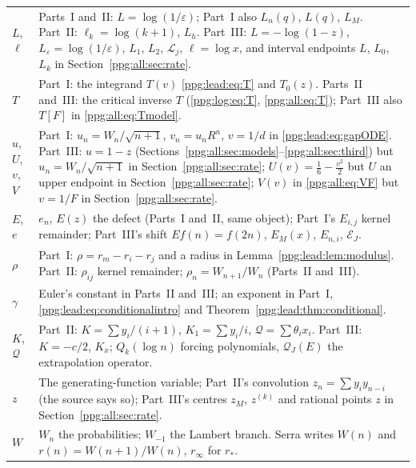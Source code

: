 \documentclass[11pt,letterpaper]{article}
\theoremstyle{remark}\newtheorem{remark}[theorem]{Remark}
\numberwithin{equation}{section}
\begin{document}
\begin{longtable}{@{}>{\raggedright\arraybackslash}p{} >{\raggedright\arraybackslash}p{}@{}}
$L$, $\ell$ & Parts~I and~II: $L=\log(1/\varepsilon)$; Part~I also $L_n(q)$, $L(q)$, $L_M$. Part~II: $\ell_k=\log(k+1)$, $L_h$. Part~III: $L=-\log(1-z)$, $L_\varepsilon=\log(1/\varepsilon)$, $L_1$, $L_2$, $\mathcal L_j$, $\ell=\log x$, and interval endpoints $L$, $L_0$, $L_k$ in Section~\ref{ppg:all:sec:rate}.\\
$T$ & Part~I: the integrand $T(v)$ \eqref{ppg:lead:eq:T} and $T_0(z)$. Parts~II and~III: the critical inverse $T$ (\eqref{ppg:log:eq:T}, \eqref{ppg:all:eq:T}); Part~III also $T[F]$ in \eqref{ppg:all:eq:Tmodel}.\\
$u$, $U$, $v$, $V$ & Part~I: $u_n=W_n/\sqrt{n+1}$, $v_n=u_nR^n$, $v=1/d$ in \eqref{ppg:lead:eq:gapODE}. Part~III: $u=1-z$ (Sections~\ref{ppg:all:sec:models}--\ref{ppg:all:sec:third}) but $u_n=W_n/\sqrt{n+1}$ in Section~\ref{ppg:all:sec:rate}; $U(v)=\frac16-\frac{v^2}2$ but $U$ an upper endpoint in Section~\ref{ppg:all:sec:rate}; $V(v)$ in \eqref{ppg:all:eq:VF} but $v=1/F$ in Section~\ref{ppg:all:sec:rate}.\\
$E$, $e$ & $e_n$, $E(z)$ the defect (Parts~I and~II, same object); Part~I's $E_{i,j}$ kernel remainder; Part~III's shift $Ef(n)=f(2n)$, $E_M(x)$, $E_{n,i}$, $\mathcal E_J$.\\
$\rho$ & Part~I: $\rho=r_m-r_i-r_j$ and a radius in Lemma~\ref{ppg:lead:lem:modulus}. Part~II: $\rho_{ij}$ kernel remainder; $\rho_n=W_{n+1}/W_n$ (Parts~II and~III).\\
$\gamma$ & Euler's constant in Parts~II and~III; an exponent in Part~I, \eqref{ppg:lead:eq:conditionalintro} and Theorem~\ref{ppg:lead:thm:conditional}.\\
$K$, $\mathcal Q$ & Part~II: $K=\sum y_i/(i+1)$, $K_1=\sum y_i/i$, $\mathcal Q=\sum\theta_ix_i$. Part~III: $K=-c/2$, $K_x$; $Q_k(\log n)$ forcing polynomials, $\mathcal Q_J(E)$ the extrapolation operator.\\
$z$ & The generating-function variable; Part~II's convolution $z_n=\sum y_iy_{n-i}$ (the source says so); Part~III's centres $z_M$, $z^{(k)}$ and rational points $z$ in Section~\ref{ppg:all:sec:rate}.\\
$W$ & $W_n$ the probabilities; $W_{-1}$ the Lambert branch. Serra writes $W(n)$ and $r(n)=W(n+1)/W(n)$, $r_\infty$ for $r_*$.\\
\bottomrule
\end{longtable}
\endgroup
\end{document}
